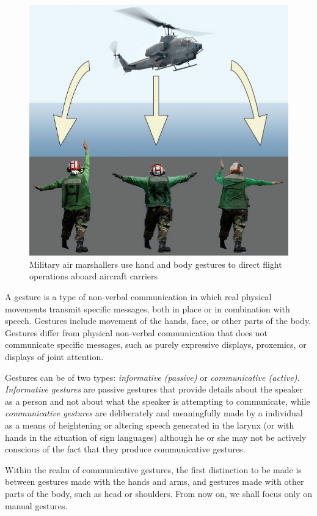 \documentclass[12pt,a4paper,twoside]{report}
\begin{document}
\begin{figure}
  \includegraphics[width=0.9\linewidth]{img/Gesture_navy.jpg}
  \caption{Military air marshallers use hand and body gestures to direct flight operations aboard aircraft carriers}
  \label{fig:air_marshallers}
\end{figure}

A gesture is a type of non-verbal communication in which real physical movements transmit specific messages, both in place or in combination with speech. Gestures include movement of the hands, face, or other parts of the body. Gestures differ from physical non-verbal communication that does not communicate specific messages, such as purely expressive displays, proxemics, or displays of joint attention. \cite{Gestures}

Gestures can be of two types: \textit{informative (passive)} or \textit{communicative (active)}. \textit{Informative gestures} are passive gestures that provide details about the speaker as a person and not about what the speaker is attempting to communicate, while \textit{communicative gestures} are deliberately and meaningfully made by a individual as a means of heightening or altering speech generated in the larynx (or with hands in the situation of sign languages) although he or she may not be actively conscious of the fact that they produce communicative gestures.

Within the realm of communicative gestures, the first distinction to be made is between gestures made with the hands and arms, and gestures made with other parts of the body, such as head or shoulders. From now on, we shall focus only on manual gestures.
\end{document}
